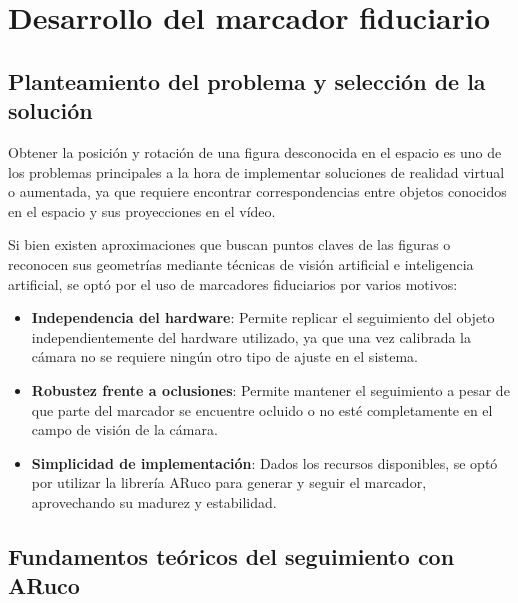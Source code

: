 \section{Desarrollo del marcador fiduciario}
\label{sec:marcador_fiduciario}

\subsection{Planteamiento del problema y selección de la solución}
Obtener la posición y rotación de una figura desconocida en el espacio es uno de los problemas principales a la hora de implementar soluciones de realidad virtual o aumentada, ya que requiere encontrar correspondencias entre objetos conocidos en el espacio y sus proyecciones en el vídeo.

Si bien existen aproximaciones que buscan puntos claves de las figuras o reconocen sus geometrías mediante técnicas de visión artificial e inteligencia artificial, se optó por el uso de  marcadores fiduciarios por varios motivos:

\begin{itemize}
    \item \textbf{Independencia del hardware}: Permite replicar el seguimiento del objeto independientemente del hardware utilizado, ya que una vez calibrada la cámara no se requiere ningún otro tipo de ajuste en el sistema.
    \item \textbf{Robustez frente a oclusiones}: Permite mantener el seguimiento a pesar de que parte del marcador se encuentre ocluido o no esté completamente en el campo de visión de la cámara.
    \item \textbf{Simplicidad de implementación}: Dados los recursos disponibles, se optó por utilizar la librería ARuco para generar y seguir el marcador, aprovechando su madurez y estabilidad.
\end{itemize}

\subsection{Fundamentos teóricos del seguimiento con ARuco}

